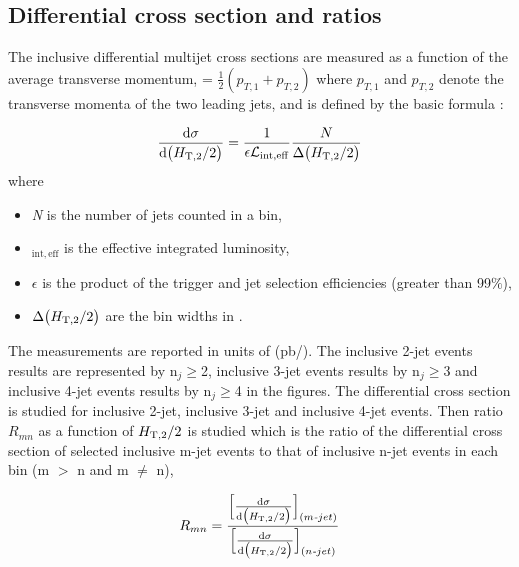\subsection{Differential cross section and ratios}
The inclusive differential multijet cross sections are measured as a
function of the average transverse momentum, \httwo =
$\frac{1}{2}(p_{T,1} + p_{T,2})$ where $p_{T,1}$ and $p_{T,2}$ denote
the transverse momenta of the two leading jets, and is defined 
by the basic formula : 

\begin{equation}
  \label{inclusive_formula}
        {\dd{\sigma}{\big(\httwo\big)}} = \frac{1}{\epsilon\lumi_{\mathrm{int,eff}}}\frac{N}{\Delta\big(\httwo\big)}
\end{equation}
where

\begin{itemize}
\item \textit{N} is the number of jets counted in a bin,
\item \lumins$_{\mathrm{int,eff}}$ is the effective integrated luminosity,
\item $\epsilon$ is the product of the trigger and jet selection efficiencies (greater than 99$\%$),
\item $\Delta\big(H_{\mathrm{T,2}}/2\big)$ are the bin widths in \httwo.
\end{itemize}

The measurements are reported in units of (pb/\GeVns). The inclusive 2-jet
events results are represented by n$_{j} \geq $2, inclusive 3-jet
events results by n$_{j} \geq $3 and inclusive 4-jet
events results by n$_{j} \geq $4 in the figures.
The differential cross section is studied for inclusive 2-jet, inclusive 3-jet and inclusive 4-jet events. Then ratio $R_{mn}$ 
as a function of $H_{\mathrm{T,2}}/2$ is studied which is the ratio of the differential cross section of selected inclusive m-jet events 
to that of inclusive n-jet events in each \httwo bin (m $>$ n and m $\neq$ n), 

\begin{equation}
  \label{eqn:ratio}
  R_{mn} = \frac{\Big[{\dd{\sigma}{\big(\httwo\big)}}\Big]_{(m\textit{-}jet)}}{\Big[{\dd{\sigma}{\big(\httwo\big)}}\Big]_
    {(n\textit{-}jet)}}
\end{equation}

